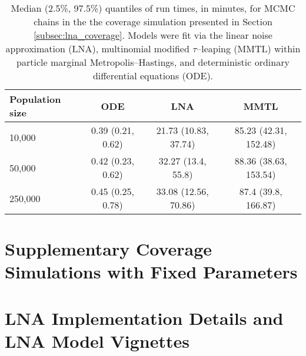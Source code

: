 \newpage
\begin{table}[ht]
	\small
	\centering
	\begin{tabular}{lccc}
		Population size & ODE & LNA & MMTL \\ 
		\hline
		10,000 & 0.39 (0.21, 0.62) & 21.73 (10.83, 37.74) & 85.23 (42.31, 152.48) \\ 
		50,000& 0.42 (0.23, 0.62) & 32.27 (13.4, 55.8) & 88.36 (38.63, 153.54) \\ 
		250,000 & 0.45 (0.25, 0.78) & 33.08 (12.56, 70.86) & 87.4 (39.8, 166.87) \\
		\hline
	\end{tabular}
	\caption{Median (2.5\%, 97.5\%) quantiles of run times, in minutes, for MCMC chains in the the coverage simulation presented in Section \ref{subsec:lna_coverage}. Models were fit via the linear noise approximation (LNA), multinomial modified $ \tau $--leaping (MMTL) within particle marginal Metropolis--Hastings, and deterministic ordinary differential equations (ODE).}
\end{table}	

\section{Supplementary Coverage Simulations with Fixed Parameters}
\label{sec:lna_fixedpar_coverage}

\section{LNA Implementation Details and LNA Model Vignettes}
\label{sec:lna_implementation_vignettes}